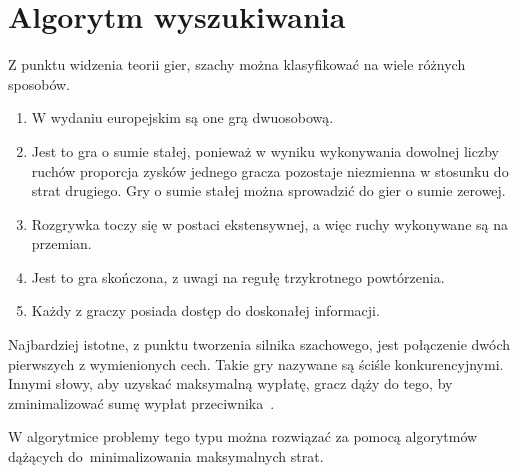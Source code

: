 \section{Algorytm wyszukiwania}
\label {sec:algorytm-wyszukiwania}


Z punktu widzenia teorii gier, szachy można klasyfikować na wiele różnych sposobów.
\begin{enumerate}
    \item W wydaniu europejskim są one grą dwuosobową.
    \item Jest to gra o sumie stałej, ponieważ w wyniku wykonywania dowolnej liczby ruchów proporcja zysków jednego gracza pozostaje niezmienna w stosunku do strat drugiego.
    Gry o sumie stałej można sprowadzić do gier o sumie zerowej.
    \item Rozgrywka toczy się w postaci ekstensywnej, a więc ruchy wykonywane są na przemian.
    \item Jest to gra skończona, z uwagi na regułę trzykrotnego powtórzenia.
    \item Każdy z graczy posiada dostęp do doskonałej informacji.
\end{enumerate}

Najbardziej istotne, z punktu tworzenia silnika szachowego, jest połączenie dwóch pierwszych z wymienionych cech.
Takie gry nazywane są ściśle konkurencyjnymi.
Innymi słowy, aby uzyskać maksymalną wypłatę, gracz dąży do tego, by zminimalizować sumę wypłat przeciwnika~\cite*{wstep-teoria-gier}.

W algorytmice problemy tego typu można rozwiązać za pomocą algorytmów dążących do~minimalizowania maksymalnych strat.



